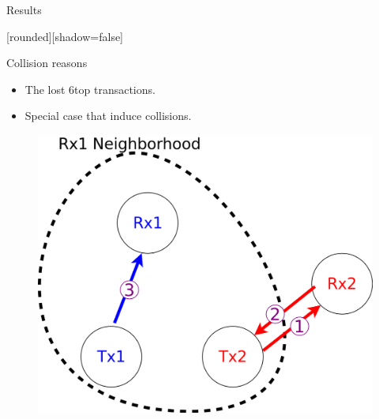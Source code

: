 \begin{withoutheadline}
\begin{frame}{ Results}


[rounded][shadow=false]


\begin{block}{Collision reasons}

    \begin{itemize}
    \item The lost 6top transactions. 
\item Special case that induce collisions.
    
     
    
    \end{itemize}
    \end{block}

\centering
\begin{figure}[p]

\item\includegraphics[width=0.4\linewidth]{figures/pro.png}
\end{figure}

\end{frame}
\end{withoutheadline}


